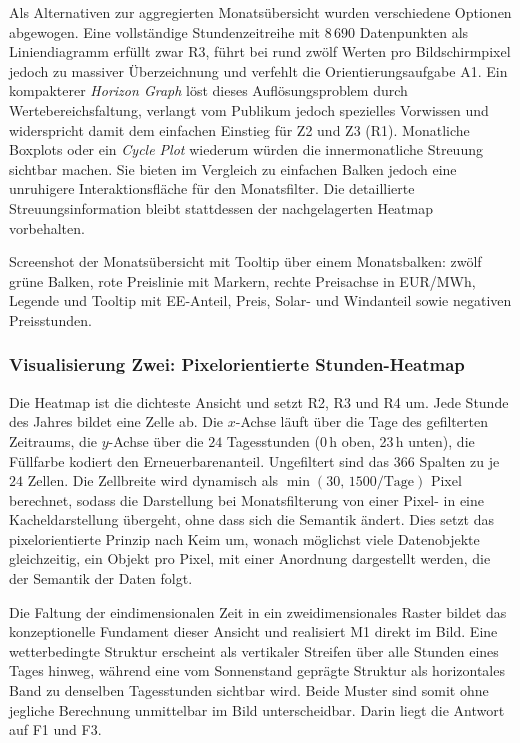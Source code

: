 Als Alternativen zur aggregierten Monatsübersicht wurden verschiedene Optionen abgewogen. Eine vollständige Stundenzeitreihe mit $8\,690$ Datenpunkten als Liniendiagramm erfüllt zwar R3, führt bei rund zwölf Werten pro Bildschirmpixel jedoch zu massiver Überzeichnung und verfehlt die Orientierungsaufgabe A1. Ein kompakterer \emph{Horizon Graph} \cite{Aigner2011} löst dieses Auflösungsproblem durch Wertebereichsfaltung, verlangt vom Publikum jedoch spezielles Vorwissen und widerspricht damit dem einfachen Einstieg für Z2 und Z3 (R1). Monatliche Boxplots oder ein \emph{Cycle Plot} wiederum würden die innermonatliche Streuung sichtbar machen. Sie bieten im Vergleich zu einfachen Balken jedoch eine unruhigere Interaktionsfläche für den Monatsfilter. Die detaillierte Streuungsinformation bleibt stattdessen der nachgelagerten Heatmap vorbehalten.

{Screenshot der Monatsübersicht mit Tooltip über einem Monatsbalken: zwölf grüne Balken, rote
Preislinie mit Markern, rechte Preisachse in EUR/MWh, Legende und Tooltip mit EE-Anteil, Preis,
Solar- und Windanteil sowie negativen Preisstunden.}

\subsubsection{Visualisierung Zwei: Pixelorientierte Stunden-Heatmap}\label{sec:vis2}

Die Heatmap ist die dichteste Ansicht und setzt R2, R3 und R4 um. Jede Stunde
des Jahres bildet eine Zelle ab. Die $x$-Achse läuft über die Tage des gefilterten Zeitraums, die
$y$-Achse über die $24$ Tagesstunden (0\,h oben, 23\,h unten), die Füllfarbe kodiert den
Erneuerbarenanteil. Ungefiltert sind das $366$ Spalten zu je $24$ Zellen. Die Zellbreite wird
dynamisch als $\min(30,\,1500/\text{Tage})$ Pixel berechnet, sodass die Darstellung bei
Monatsfilterung von einer Pixel- in eine Kacheldarstellung übergeht, ohne dass sich die Semantik
ändert. Dies setzt das pixelorientierte Prinzip nach Keim \cite{Keim2000} um, wonach möglichst
viele Datenobjekte gleichzeitig, ein Objekt pro Pixel, mit einer Anordnung dargestellt werden, die der Semantik der
Daten folgt.

Die Faltung der eindimensionalen Zeit in ein zweidimensionales Raster bildet das konzeptionelle Fundament
dieser Ansicht und realisiert M1 direkt im Bild. Eine wetterbedingte Struktur erscheint als vertikaler
Streifen über alle Stunden eines Tages hinweg, während eine vom Sonnenstand geprägte Struktur als
horizontales Band zu denselben Tagesstunden sichtbar wird. Beide Muster sind somit ohne jegliche
Berechnung unmittelbar im Bild unterscheidbar. Darin liegt die Antwort auf F1 und F3.

